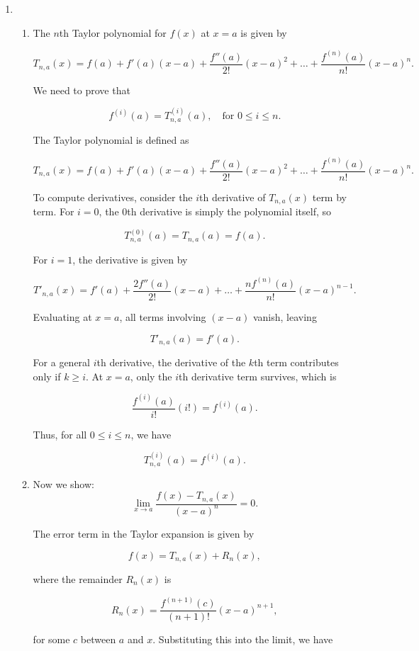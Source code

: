 \documentclass[12pt]{article}
\begin{document}
\begin{enumerate}
    \item 
    \begin{enumerate}
    \item 
    The $n$th Taylor polynomial for $f(x)$ at $x = a$ is given by

\[
T_{n,a}(x) = f(a) + f'(a)(x-a) + \frac{f''(a)}{2!}(x-a)^2 + \dots + \frac{f^{(n)}(a)}{n!}(x-a)^n.
\]

We need to prove that

\[
f^{(i)}(a) = T^{(i)}_{n,a}(a), \quad \text{for } 0 \leq i \leq n.
\]

The Taylor polynomial is defined as

\[
T_{n,a}(x) = f(a) + f'(a)(x-a) + \frac{f''(a)}{2!}(x-a)^2 + \dots + \frac{f^{(n)}(a)}{n!}(x-a)^n.
\]

To compute derivatives, consider the $i$th derivative of $T_{n,a}(x)$ term by term. For $i=0$, the 0th derivative is simply the polynomial itself, so

\[
T^{(0)}_{n,a}(a) = T_{n,a}(a) = f(a).
\]

For $i=1$, the derivative is given by

\[
T'_{n,a}(x) = f'(a) + \frac{2f''(a)}{2!}(x-a) + \dots + \frac{n f^{(n)}(a)}{n!}(x-a)^{n-1}.
\]

Evaluating at $x = a$, all terms involving $(x-a)$ vanish, leaving

\[
T'_{n,a}(a) = f'(a).
\]

For a general $i$th derivative, the derivative of the $k$th term contributes only if $k \geq i$. At $x = a$, only the $i$th derivative term survives, which is

\[
\frac{f^{(i)}(a)}{i!}(i!) = f^{(i)}(a).
\]

Thus, for all $0 \leq i \leq n$, we have

\[
T^{(i)}_{n,a}(a) = f^{(i)}(a).
\]


\item 
Now we show:
\[
\lim_{x \to a} \frac{f(x) - T_{n,a}(x)}{(x-a)^n} = 0.
\]

The error term in the Taylor expansion is given by

\[
f(x) = T_{n,a}(x) + R_n(x),
\]

where the remainder $R_n(x)$ is

\[
R_n(x) = \frac{f^{(n+1)}(c)}{(n+1)!}(x-a)^{n+1},
\]

for some $c$ between $a$ and $x$. Substituting this into the limit, we have


\end{enumerate}
\end{enumerate}
\end{document}
